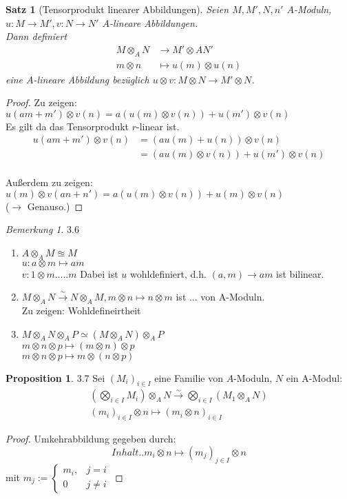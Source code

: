 \documentclass[10pt,a4paper]{article}
\newcounter{thm}[section]
\theoremstyle{definition}
\newtheorem{prop}[thm]{Proposition}
\theoremstyle{plain}
\newtheorem{satz}[thm]{Satz}
\theoremstyle{remark}
\newtheorem{bem}[thm]{Bemerkung}
\begin{document}
\begin{satz}[Tensorprodukt linearer Abbildungen]
	Seien $M,M',N,n'$ $A$-Moduln, $u:M\rightarrow M',v:N\rightarrow N'$ $A$-lineare Abbildungen.\\
	Dann definiert
	\begin{align*}
	M\otimes_A N&\rightarrow M'\otimes A N'\\
	m\otimes n &\mapsto u(m)\otimes u(n)
	\end{align*}
	eine $A$-lineare Abbildung bezüglich $u\otimes v:M\otimes N\rightarrow M'\otimes N$.
\end{satz}
\begin{proof}
	Zu zeigen: $u(am+m')\otimes v(n)=a(u(m)\otimes v(n))+u(m')\otimes v(n)$\\
	Es gilt da das Tensorprodukt $r$-linear ist.
	\begin{align*}
	u(am+m')\otimes v(n)&=(au(m)+u(n))\otimes v(n)\\
	&=(au(m)\otimes v(n))+u(m')\otimes v(n)
	\end{align*}
	\\
	Außerdem zu zeigen: $u(m)\otimes v(an+n')=a(u(m)\otimes v(n))+u(m)\otimes v(n)$\\
	($\rightarrow $ Genauso.)
\end{proof}
\begin{bem}
	3.6\\
	\begin{enumerate}
		\item $A\otimes_A M\approxeq M$\\
		$u: a\otimes m\mapsto am$\\
		$v: 1\otimes m.....m $
		Dabei ist $u$ wohldefiniert, d.h. $(a,m)\rightarrow am$ ist bilinear.
		\item $M\otimes_A N\xrightarrow{\sim}N\otimes_A M, m\otimes n\mapsto n\otimes m$ ist ... von A-Moduln.\\
		Zu zeigen: Wohldefineirtheit 
		\item $M\otimes_A N\otimes_A P\simeq (M\otimes_A N)\otimes_A P$\\
		$m\otimes n\otimes p\mapsto (m\otimes n)\otimes p$\\
		$m\otimes n\otimes p\mapsto m\otimes (n\otimes p)$
	\end{enumerate}
\end{bem}
\begin{prop}3.7
	Sei $(M_i)_{i\in I}$ eine Familie von $A$-Moduln, $N$ ein A-Modul:\begin{align*}
	\left(\bigotimes_{i\in I}M_i\right)\otimes_A N\xrightarrow{\sim} \bigotimes_{i\in I}\left(M_1\otimes_A N\right)\\
	(m_i)_{i\in I}\otimes n\mapsto(m_i\otimes n)_{i\in I}
	\end{align*}
\end{prop}
\begin{proof}
	Umkehrabbildung gegeben durch:\[Inhalt..m_i\otimes n\mapsto (m_j)_{j\in I}\otimes n\]
	mit $m_j:=\begin{cases}
	m_i, &j=i\\
	0 &j\neq i
	\end{cases}$
\end{proof}
\end{document}
